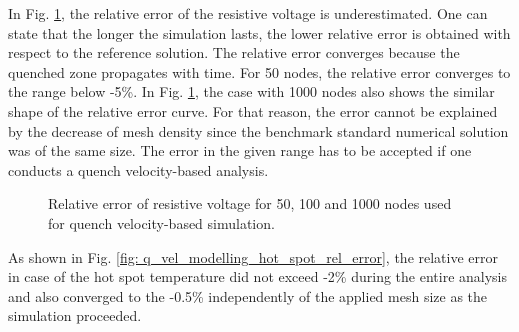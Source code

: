In Fig. \ref{fig: q_vel_modelling_res_volt_rel_error}, the relative error of the resistive voltage is underestimated. One can state that the longer the simulation lasts, the lower relative error is obtained with respect to the reference solution. The relative error converges because the quenched zone propagates with time. For 50 nodes, the relative error converges to the range below -5\%.
In Fig. \ref{fig: q_vel_modelling_res_volt_rel_error}, the case with 1000 nodes also shows the similar shape of the relative error curve. For that reason, the error cannot be explained by the decrease of mesh density since the benchmark standard numerical solution was of the same size. The error in the given range has to be accepted if one conducts a quench velocity-based analysis.

\begin{figure}[H]
\centering
    \caption{Relative error of resistive voltage for 50, 100 and 1000 nodes used for quench velocity-based simulation.}
    \label{fig: q_vel_modelling_res_volt_rel_error}
\end{figure}

As shown in Fig. \ref{fig: q_vel_modelling_hot_spot_rel_error}, the relative error in case of the hot spot temperature did not exceed -2\% during the entire analysis and also converged to the -0.5\% independently of the applied mesh size as the simulation proceeded. 

